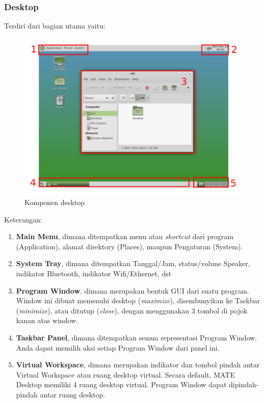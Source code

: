 \documentclass[12pt,]{article}
\begin{document}
	\subsubsection{Desktop}
	Terdiri dari bagian utama yaitu:
	\begin{figure}[H]
		\centering
		\includegraphics[width=0.8\linewidth]{images/vbox_de/matedesktop}
		\caption{Komponen desktop}
	\end{figure} 
	Keterangan:
	\begin{enumerate}
		\item \textbf{Main Menu}, dimana ditempatkan menu atau \textit{shortcut} dari program (Application),
		alamat direktory (Places),
		maupun Pengaturan (System).
		
		\item \textbf{System Tray}, dimana ditempatkan Tanggal/Jam,
		status/volune Speaker, 
		indikator Bluetooth,
		indikator Wifi/Ethernet, 
		dst
		
		\item \textbf{Program Window}. dimana merupakan bentuk GUI dari suatu program.
		Window ini dibuat memenuhi desktop (\textit{maximize}),
		disembunyikan ke Taskbar (\textit{minimize}),
		atau ditutup (\textit{close}),
		dengan menggunakan 3 tombol di pojok kanan atas window.
		
		\item \textbf{Taskbar Panel}, dimana ditempatkan semua representasi Program Window.
		Anda dapat memilih aksi setiap Program Window dari panel ini.
		
		\item \textbf{Virtual Workspace}, dimana merupakan indikator dan tombol pindah antar Virtual Workspace atau ruang desktop virtual.
		Secara default, MATE Desktop memiliki 4 ruang desktop virtual.
		Program Window dapat dipindah-pindah antar ruang desktop. 
	\end{enumerate}
\end{document}
